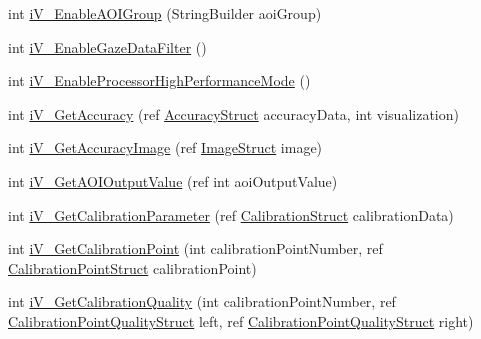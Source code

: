 \begin{DoxyCompactItemize}
\item 
int \hyperlink{class_web_analyzer_1_1_eye_tracking_1_1_eye_tracking_controller_a286f8b66eccb70f8d841fffea1696a37}{i\+V\+\_\+\+Enable\+A\+O\+I\+Group} (String\+Builder aoi\+Group)
\item 
int \hyperlink{class_web_analyzer_1_1_eye_tracking_1_1_eye_tracking_controller_aa97be5e87ac429eafd831a7c5a01ebb9}{i\+V\+\_\+\+Enable\+Gaze\+Data\+Filter} ()
\item 
int \hyperlink{class_web_analyzer_1_1_eye_tracking_1_1_eye_tracking_controller_a087f617ed5741beaf286f370c4088de4}{i\+V\+\_\+\+Enable\+Processor\+High\+Performance\+Mode} ()
\item 
int \hyperlink{class_web_analyzer_1_1_eye_tracking_1_1_eye_tracking_controller_a9cad9ddc1372e8bf197490be9f56dac2}{i\+V\+\_\+\+Get\+Accuracy} (ref \hyperlink{struct_web_analyzer_1_1_eye_tracking_1_1_eye_tracking_controller_1_1_accuracy_struct}{Accuracy\+Struct} accuracy\+Data, int visualization)
\item 
int \hyperlink{class_web_analyzer_1_1_eye_tracking_1_1_eye_tracking_controller_ac77998635d8f372382023952ee8b7a65}{i\+V\+\_\+\+Get\+Accuracy\+Image} (ref \hyperlink{struct_web_analyzer_1_1_eye_tracking_1_1_eye_tracking_controller_1_1_image_struct}{Image\+Struct} image)
\item 
int \hyperlink{class_web_analyzer_1_1_eye_tracking_1_1_eye_tracking_controller_a68805881c58180c62050018f7b568e0e}{i\+V\+\_\+\+Get\+A\+O\+I\+Output\+Value} (ref int aoi\+Output\+Value)
\item 
int \hyperlink{class_web_analyzer_1_1_eye_tracking_1_1_eye_tracking_controller_afc97e90ffad447991dab299109bcdc06}{i\+V\+\_\+\+Get\+Calibration\+Parameter} (ref \hyperlink{struct_web_analyzer_1_1_eye_tracking_1_1_eye_tracking_controller_1_1_calibration_struct}{Calibration\+Struct} calibration\+Data)
\item 
int \hyperlink{class_web_analyzer_1_1_eye_tracking_1_1_eye_tracking_controller_a164cd53cf5e7720b14b8164d0a30248e}{i\+V\+\_\+\+Get\+Calibration\+Point} (int calibration\+Point\+Number, ref \hyperlink{struct_web_analyzer_1_1_eye_tracking_1_1_eye_tracking_controller_1_1_calibration_point_struct}{Calibration\+Point\+Struct} calibration\+Point)
\item 
int \hyperlink{class_web_analyzer_1_1_eye_tracking_1_1_eye_tracking_controller_ad2a6af5ce4e8cecff002fcbd74f335e5}{i\+V\+\_\+\+Get\+Calibration\+Quality} (int calibration\+Point\+Number, ref \hyperlink{struct_web_analyzer_1_1_eye_tracking_1_1_eye_tracking_controller_1_1_calibration_point_quality_struct}{Calibration\+Point\+Quality\+Struct} left, ref \hyperlink{struct_web_analyzer_1_1_eye_tracking_1_1_eye_tracking_controller_1_1_calibration_point_quality_struct}{Calibration\+Point\+Quality\+Struct} right)

\end{DoxyCompactItemize}

